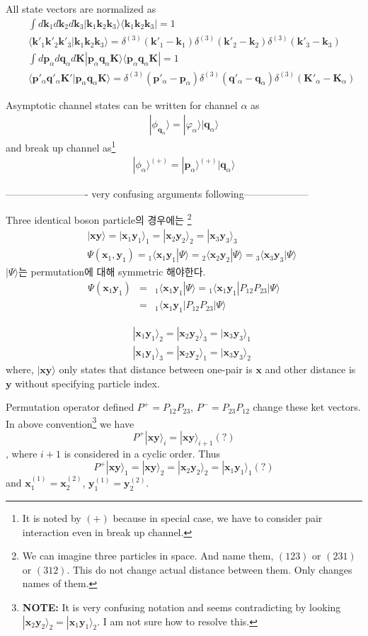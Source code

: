 \documentclass[11pt]{article}
\def\bm{\boldsymbol}
\newcommand{\bea}{\begin{eqnarray}}
\newcommand{\eea}{\end{eqnarray}}
\newcommand{\no}{\nonumber \\}
\newcommand{\vp}{{\bm p}}
\newcommand{\vq}{{\bm q}}
\newcommand{\vk}{{\bm k}}
\newcommand{\vx}{{\bm x}}
\newcommand{\vy}{{\bm y}}
\newcommand{\la}{\langle}
\newcommand{\ra}{\rangle}
\begin{document}
All state vectors are normalized as
\bea
& &\int d\vk_1 d \vk_2 d\vk_3|\vk_1 \vk_2\vk_3\ra\la \vk_1\vk_2\vk_3|=1 \no
& &\la \vk'_1\vk'_2\vk'_3|\vk_1\vk_2\vk_3\ra
=\delta^{(3)}(\vk'_1-\vk_1)\delta^{(3)}(\vk'_2-\vk_2)
 \delta^{(3)}(\vk'_3-\vk_3)\no
& &\int d\vp_\alpha d\vq_\alpha d{\bm K}
  |\vp_\alpha \vq_\alpha {\bm K}\ra\la \vp_\alpha \vq_\alpha {\bm K}|=1\no
& &\la \vp'_\alpha \vq'_\alpha {\bm K}'|\vp_\alpha \vq_\alpha {\bm K}\ra=\delta^{(3)}(\vp'_\alpha-\vp_\alpha) \delta^{(3)}(\vq'_\alpha-\vq_\alpha)\delta^{(3)}({\bm K}'_\alpha-{\bm K}_\alpha) 
\eea

Asymptotic channel states can be written for 
channel $\alpha$ as
\bea
|\phi_{\vq_\alpha}\ra=|\varphi_\alpha\ra|\vq_\alpha\ra
\eea
and break up channel as\footnote{
It is noted by $(+)$ because in special case, we have to consider 
pair interaction even in break up channel. }
\bea
|\phi_{\alpha}\ra^{(+)}=|\vp_\alpha\ra^{(+)}|\vq_\alpha\ra
\eea

------------------------- very confusing arguments following--------------------


{\color{blue} Three identical boson} particle의 경우에는
\footnote{We can imagine three particles in space. And name them,
$(123)$ or $(231)$ or $(312)$. This do not change actual distance 
between them. Only changes names of them. 
} 
\bea
& &|\vx \vy\ra=|\vx_1 \vy_1\ra_1=|\vx_2\vy_2\ra_2=|\vx_3 \vy_3\ra_3 \no
& &\Psi(\vx_1,\vy_1)={}_1\la \vx_1 \vy_1|\Psi\ra 
 ={}_2\la \vx_2 \vy_2|\Psi\ra={}_3\la \vx_3 \vy_3|\Psi\ra
\eea 
$|\Psi\ra$는 permutation에 대해 symmetric 해야한다. 
\bea
\Psi(\vx_1 \vy_1)&=&{}_1\la \vx_1\vy_1|\Psi\ra={}_1\la \vx_1\vy_1|P_{12}P_{23}|\Psi\ra\no 
   &=&{}_1\la \vx_1\vy_1|P_{12}P_{23}|\Psi\ra
\eea 

\bea 
& &|\vx_1 \vy_1\ra_2=|\vx_2 \vy_2\ra_3=|\vx_3 \vy_3\ra_1 \no
& &|\vx_1 \vy_1\ra_3=|\vx_2 \vy_2\ra_1=|\vx_3 \vy_3\ra_2
\eea
where, $|\vx\vy\ra$ only states that distance 
between one-pair is $\vx$ and other distance is $\vy$
without specifying particle index.


Permutation operator defined $P^+=P_{12}P_{23}$, $P^{-}=P_{23} P_{12}$
change these ket vectors. 
In above convention\footnote{{\bf NOTE:} It is very confusing
notation and seems contradicting by looking
$|\vx_2 \vy_2\ra_2 =|\vx_1 \vy_1\ra_2$. I am not sure how to 
resolve this.
}
we have
$$P^+|\vx\vy\ra_i=|\vx\vy\ra_{i+1} (?)$$,
where $i+1$ is considered in a cyclic order.
Thus
$$P^+|\vx\vy\ra_1=|\vx\vy\ra_2=|\vx_2\vy_2\ra_2=
|\vx_1 \vy_1\ra_1 (?)$$
and $\vx_1^{(1)}=\vx_2^{(2)}$, $\vy_1^{(1)}=\vy_2^{(2)}$.
 
\end{document}
